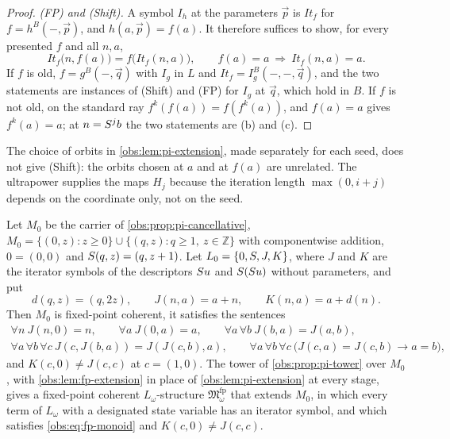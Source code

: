 \begin{proof}
\emph{(FP) and (Shift).} A symbol $I_h$ at the parameters $\vec p$ is
$\mathit{It}_f$ for $f=h^{B}(-,\vec p)$, and $h(a,\vec p)=f(a)$. It therefore
suffices to show, for every presented $f$ and all $n,a$,
\[
\mathit{It}_f\bigl(n,f(a)\bigr)=f\bigl(\mathit{It}_f(n,a)\bigr),\qquad
f(a)=a\ \Rightarrow\ \mathit{It}_f(n,a)=a .
\]
If $f$ is old, $f=g^{B}(-,\vec q)$ with $I_g$ in $L$ and
$\mathit{It}_f=I_g^{B}(-,-,\vec q)$, and the two statements are instances of
(Shift) and (FP) for $I_g$ at $\vec q$, which hold in $B$. If $f$ is not old,
on the standard ray $f^{k}(f(a))=f(f^{k}(a))$, and $f(a)=a$ gives $f^{k}(a)=a$;
at $n=S^{j}b$ the two statements are (b) and (c).
\end{proof}

The choice of orbits in \cref{obs:lem:pi-extension}, made separately for each
seed, does not give (Shift): the orbits chosen at $a$ and at $f(a)$ are
unrelated. The ultrapower supplies the maps $H_j$ because the iteration length
$\max(0,i+j)$ depends on the coordinate only, not on the seed.

\begin{proposition}
\label{obs:prop:fp-tower}
Let $M_0$ be the carrier of \cref{obs:prop:pi-cancellative},
$M_0=\{(0,z):z\ge 0\}\cup\{(q,z):q\ge 1,\ z\in\mathbb{Z}\}$ with componentwise
addition, $0=(0,0)$ and $S(q,z)=(q,z+1)$. Let $L_0=\{0,S,J,K\}$, where
$J$ and $K$ are the iterator symbols of the descriptors $S u$ and
$S(S u)$ without parameters, and put
\[
d(q,z)=(q,2z),\qquad J(n,a)=a+n,\qquad K(n,a)=a+d(n).
\]
Then $M_0$ is fixed-point coherent, it satisfies the sentences
\begin{equation}
\label{obs:eq:fp-monoid}
\begin{gathered}
\forall n\ J(n,0)=n,\qquad \forall a\ J(0,a)=a,\qquad
\forall a\,\forall b\ J(b,a)=J(a,b),\\
\forall a\,\forall b\,\forall c\ J(c,J(b,a))=J(J(c,b),a),\qquad
\forall a\,\forall b\,\forall c\ \bigl(J(c,a)=J(c,b)\to a=b\bigr),
\end{gathered}
\end{equation}
and $K(c,0)\ne J(c,c)$ at $c=(1,0)$. The tower of \cref{obs:prop:pi-tower}
over $M_0$, with \cref{obs:lem:fp-extension} in place of
\cref{obs:lem:pi-extension} at every stage, gives a fixed-point coherent
$L_\omega$-structure $\mathfrak{M}^{\mathrm{fp}}_\omega$ that extends $M_0$, in
which every term of $L_\omega$ with a designated state variable has an iterator
symbol, and which satisfies \eqref{obs:eq:fp-monoid} and $K(c,0)\ne J(c,c)$.
\end{proposition}

